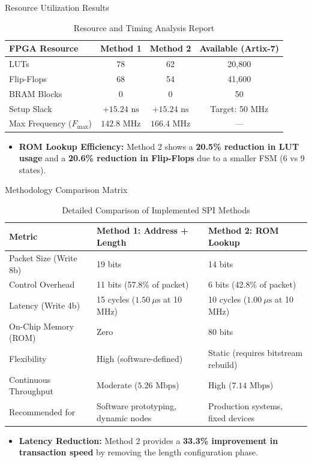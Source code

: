 \documentclass{beamer}
\begin{document}
\begin{frame}{Resource Utilization Results}
  \begin{table}
    \centering\small
    \begin{tabular}{lccc}
      \toprule
      \textbf{FPGA Resource} & \textbf{Method 1} & \textbf{Method 2} & \textbf{Available (Artix-7)} \\
      \midrule
      LUTs & 78 & 62 & 20,800 \\
      Flip-Flops & 68 & 54 & 41,600 \\
      BRAM Blocks & 0 & 0 & 50 \\
      Setup Slack & $+15.24\text{ ns}$ & $+15.24\text{ ns}$ & Target: 50 MHz \\
      Max Frequency ($F_{\text{max}}$) & $142.8\text{ MHz}$ & $166.4\text{ MHz}$ & — \\
      \bottomrule
    \end{tabular}
    \caption{Resource and Timing Analysis Report}
  \end{table}
  \begin{itemize}
    \item \textbf{ROM Lookup Efficiency:} Method 2 shows a \textbf{20.5\% reduction in LUT usage} and a \textbf{20.6\% reduction in Flip-Flops} due to a smaller FSM (6 vs 9 states).
  \end{itemize}
\end{frame}

\begin{frame}{Methodology Comparison Matrix}
  \begin{table}
    \centering\tiny
    \begin{tabular}{lll}
      \toprule
      \textbf{Metric} & \textbf{Method 1: Address + Length} & \textbf{Method 2: ROM Lookup} \\
      \midrule
      Packet Size (Write 8b) & 19 bits & 14 bits \\
      Control Overhead & 11 bits (57.8\% of packet) & 6 bits (42.8\% of packet) \\
      Latency (Write 4b) & 15 cycles ($1.50\ \mu\text{s}$ at 10 MHz) & 10 cycles ($1.00\ \mu\text{s}$ at 10 MHz) \\
      On-Chip Memory (ROM) & Zero & 80 bits \\
      Flexibility & High (software-defined) & Static (requires bitstream rebuild) \\
      Continuous Throughput & Moderate ($5.26\text{ Mbps}$) & High ($7.14\text{ Mbps}$) \\
      Recommended for & Software prototyping, dynamic nodes & Production systems, fixed devices \\
      \bottomrule
    \end{tabular}
    \caption{Detailed Comparison of Implemented SPI Methods}
  \end{table}
  \begin{itemize}
    \item \textbf{Latency Reduction:} Method 2 provides a \textbf{33.3\% improvement in transaction speed} by removing the length configuration phase.
  \end{itemize}
\end{frame}
\end{document}

